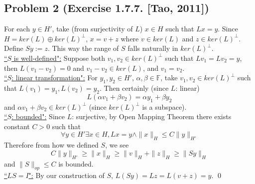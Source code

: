 \documentclass[12pt,a4paper]{article}
\newcommand{\claim}[1]{\underline{``{#1}":}}
\begin{document}
\newpage\subsection*{Problem 2 (Exercise 1.7.7. [Tao, 2011])}
For each $y\in H'$, take (from surjectivity of $L$) $x \in H$ such that $Lx = y$. Since $H = ker(L) \oplus ker(L)^\perp$, $x = v + z$ where $v \in ker(L)$ and $z\in ker(L)^\perp$. Define $Sy := z$. This way the range of $S$ falls naturally in $ker(L)^\perp$. \\
\claim{$S$ is well-defined} Suppose both $v_1, v_2 \in ker(L)^\perp$ such that $Lv_1 = Lv_2 = y$, then $L(v_1 - v_2) = 0$ and $v_1 - v_2 \in ker(L)$, and $v_1 = v_2$.\\
\claim{$S$: linear transformation} For $y_1, y_2 \in H'$, $\alpha, \beta \in \mathbb F$, take $v_1, v_2 \in ker(L)^\perp$ such that $L(v_1) = y_1, L(v_2) = y_2$. Then certainly (since $L$: linear)
$$L(\alpha v_1 + \beta v_2) = \alpha y_1 + \beta y_2$$
and $\alpha v_1 + \beta v_2 \in ker(L)^\perp$ (since $ker(L)^\perp$ is a subspace). \\
\claim{$S$: bounded} Since $L$: surjective, by Open Mapping Theorem there exists constant $C>0$ such that 
$$\forall y\in H' \exists x\in H, Lx = y \wedge \|x\|_H \leq C\|y\|_{H'}$$
Therefore from how we defined $S$, we see 
$$C\|y\|_{H'} \geq \|x\|_H \geq \|v\|_H + \|z\|_H \geq \|Sy\|_H$$
and $\|S\|_{op} \leq C$ is bounded. \\
\claim{$LS = I$} By our construction of $S$, $L(S y) = Lz = L(v+z) = y$. \qed
\end{document}
